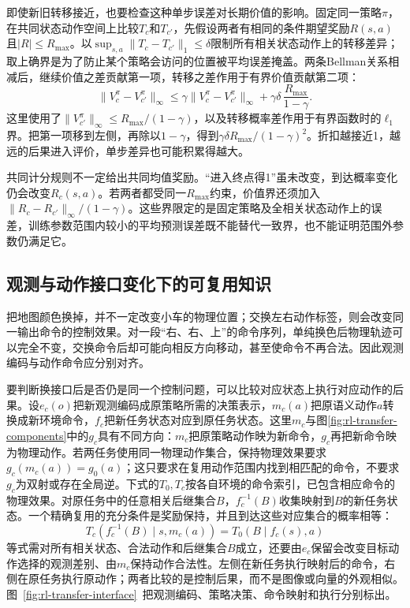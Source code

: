 即使新旧转移接近，也要检查这种单步误差对长期价值的影响。固定同一策略$\pi$，在共同状态动作空间上比较$T_c$和$T_{c'}$，先假设两者有相同的条件期望奖励$R(s,a)$且$|R|\leq R_{\max}$。以$\sup_{s,a}\lVert T_c-T_{c'}\rVert_1\leq\delta$限制所有相关状态动作上的转移差异；取上确界是为了防止某个策略会访问的位置被平均误差掩盖。两条Bellman关系相减后，继续价值之差贡献第一项，转移之差作用于有界价值贡献第二项：
\[
 \lVert V_c^\pi-V_{c'}^\pi\rVert_\infty
 \leq \gamma\lVert V_c^\pi-V_{c'}^\pi\rVert_\infty
      +\gamma\delta\,\frac{R_{\max}}{1-\gamma}.
\]
这里使用了$\lVert V_{c'}^\pi\rVert_\infty\leq R_{\max}/(1-\gamma)$，以及转移概率差作用于有界函数时的$\ell_1$界。把第一项移到左侧，再除以$1-\gamma$，得到$\gamma\delta R_{\max}/(1-\gamma)^2$。折扣越接近1，越远的后果进入评价，单步差异也可能积累得越大。

共同计分规则不一定给出共同均值奖励。“进入终点得1”虽未改变，到达概率变化仍会改变$R_c(s,a)$。若两者都受同一$R_{\max}$约束，价值界还须加入$\lVert R_c-R_{c'}\rVert_\infty/(1-\gamma)$。这些界限定的是固定策略及全相关状态动作上的误差，训练参数范围内较小的平均预测误差既不能替代一致界，也不能证明范围外参数仍满足它。

\subsection{观测与动作接口变化下的可复用知识}
\label{sec:rl-transfer-interface}

把地图颜色换掉，并不一定改变小车的物理位置；交换左右动作标签，则会改变同一输出命令的控制效果。对一段“右、右、上”的命令序列，单纯换色后物理轨迹可以完全不变，交换命令后却可能向相反方向移动，甚至使命令不再合法。因此观测编码与动作命令应分别对齐。

要判断换接口后是否仍是同一个控制问题，可以比较对应状态上执行对应动作的后果。设$e_c(o)$把新观测编码成原策略所需的决策表示，$m_c(a)$把原语义动作$a$转换成新环境命令，$f_c$把新任务状态对应到原任务状态。这里$m_c$与图\ref{fig:rl-transfer-components}中的$g_c$具有不同方向：$m_c$把原策略动作映为新命令，$g_c$再把新命令映为物理动作。若两任务使用同一物理动作集合，保持物理效果要求$g_c(m_c(a))=g_0(a)$；这只要求在复用动作范围内找到相匹配的命令，不要求$g_c$为双射或存在全局逆。下式的$T_0,T_c$按各自环境的命令索引，已包含相应命令的物理效果。对原任务中的任意相关后继集合$B$，$f_c^{-1}(B)$收集映射到$B$的新任务状态。一个精确复用的充分条件是奖励保持，并且到达这些对应集合的概率相等：
\[
 T_c\!\left(f_c^{-1}(B)\mid s,m_c(a)\right)
 =T_0\!\left(B\mid f_c(s),a\right)
\]
等式需对所有相关状态、合法动作和后继集合$B$成立，还要由$e_c$保留会改变目标动作选择的观测差别、由$m_c$保持动作合法性。左侧在新任务执行映射后的命令，右侧在原任务执行原动作；两者比较的是控制后果，而不是图像或向量的外观相似。图~\ref{fig:rl-transfer-interface}~把观测编码、策略决策、命令映射和执行分别标出。

